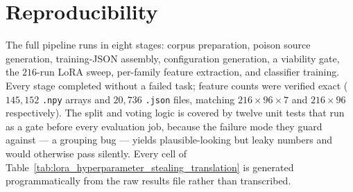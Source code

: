 \documentclass[11pt]{article}
\begin{document}
\section{Reproducibility}

The full pipeline runs in eight stages: corpus preparation, poison source generation,
training-JSON assembly, configuration generation, a viability gate, the $216$-run LoRA
sweep, per-family feature extraction, and classifier training. Every stage completed
without a failed task; feature counts were verified exact ($145{,}152$ \texttt{.npy}
arrays and $20{,}736$ \texttt{.json} files, matching $216 \times 96 \times 7$ and
$216 \times 96$ respectively). The split and voting logic is covered by twelve unit tests
that run as a gate before every evaluation job, because the failure mode they guard
against --- a grouping bug --- yields plausible-looking but leaky numbers and would
otherwise pass silently. Every cell of
Table~\ref{tab:lora_hyperparameter_stealing_translation} is generated programmatically
from the raw results file rather than transcribed.
\end{document}
